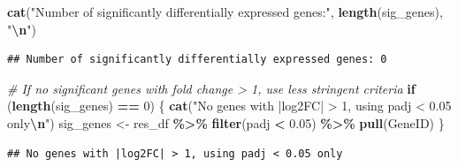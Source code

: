 \documentclass[
]{article}
\newenvironment{Shaded}{\begin{snugshade}}{\end{snugshade}}
\newcommand{\CommentTok}[1]{\textcolor[rgb]{0.56,0.35,0.01}{\textit{#1}}}
\newcommand{\ControlFlowTok}[1]{\textcolor[rgb]{0.13,0.29,0.53}{\textbf{#1}}}
\newcommand{\DecValTok}[1]{\textcolor[rgb]{0.00,0.00,0.81}{#1}}
\newcommand{\FloatTok}[1]{\textcolor[rgb]{0.00,0.00,0.81}{#1}}
\newcommand{\FunctionTok}[1]{\textcolor[rgb]{0.13,0.29,0.53}{\textbf{#1}}}
\newcommand{\NormalTok}[1]{#1}
\newcommand{\OtherTok}[1]{\textcolor[rgb]{0.56,0.35,0.01}{#1}}
\newcommand{\SpecialCharTok}[1]{\textcolor[rgb]{0.81,0.36,0.00}{\textbf{#1}}}
\newcommand{\StringTok}[1]{\textcolor[rgb]{0.31,0.60,0.02}{#1}}
\begin{document}
\begin{Shaded}
\begin{Highlighting}[]
\FunctionTok{cat}\NormalTok{(}\StringTok{"Number of significantly differentially expressed genes:"}\NormalTok{, }\FunctionTok{length}\NormalTok{(sig\_genes), }\StringTok{"}\SpecialCharTok{\textbackslash{}n}\StringTok{"}\NormalTok{)}
\end{Highlighting}
\end{Shaded}

\begin{verbatim}
## Number of significantly differentially expressed genes: 0
\end{verbatim}

\begin{Shaded}
\begin{Highlighting}[]
\CommentTok{\# If no significant genes with fold change \textgreater{} 1, use less stringent criteria}
\ControlFlowTok{if}\NormalTok{ (}\FunctionTok{length}\NormalTok{(sig\_genes) }\SpecialCharTok{==} \DecValTok{0}\NormalTok{) \{}
  \FunctionTok{cat}\NormalTok{(}\StringTok{"No genes with |log2FC| \textgreater{} 1, using padj \textless{} 0.05 only}\SpecialCharTok{\textbackslash{}n}\StringTok{"}\NormalTok{)}
\NormalTok{  sig\_genes }\OtherTok{\textless{}{-}}\NormalTok{ res\_df }\SpecialCharTok{\%\textgreater{}\%}
    \FunctionTok{filter}\NormalTok{(padj }\SpecialCharTok{\textless{}} \FloatTok{0.05}\NormalTok{) }\SpecialCharTok{\%\textgreater{}\%}
    \FunctionTok{pull}\NormalTok{(GeneID)}
\NormalTok{\}}
\end{Highlighting}
\end{Shaded}

\begin{verbatim}
## No genes with |log2FC| > 1, using padj < 0.05 only
\end{verbatim}
\end{document}
